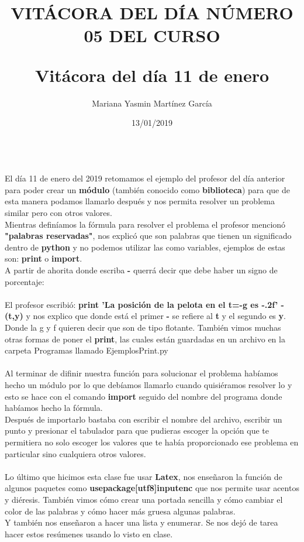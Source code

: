 \documentclass[letterpaper, 12pt, twoside]{article}
\title{\Huge\item\color{red}\textbf {VITÁCORA DEL DÍA NÚMERO 05 DEL CURSO}}
\author{Mariana Yasmin Martínez García}
\date{13/01/2019}
\begin{document}
	\maketitle
	
	\newpage
	\title{\huge\textbf{Vitácora del día 11 de enero\\}} \\
	El día 11 de enero del 2019 retomamos el ejemplo del profesor del día anterior para poder crear un \textbf{módulo} (también conocido como \textbf{biblioteca}) para que de esta manera podamos llamarlo después y nos permita resolver un problema similar pero con otros valores.\\
	Mientras definíamos la fórmula para resolver el problema el profesor  mencionó \textbf{"palabras reservadas"}, nos explicó que son palabras que tienen un significado dentro de \textbf{python} y no podemos utilizar las como variables, ejemplos de estas son: \textbf{print} o \textbf{import}. \\
	A partir de ahorita donde escriba \textbf{-} querrá decir que debe haber un signo de porcentaje:\\ \\
	El profesor escribió: \textbf{print 'La posición de la pelota en el t=-g es -.2f' - (t,y)}
	y nos explico que donde está el primer \textbf{-} se refiere al \textbf{t} y el segundo es \textbf{y}. Donde la g y f quieren decir que son de tipo flotante.
	También vimos muchas otras formas de poner el \textbf{print}, las cuales están guardadas en un archivo en la carpeta Programas llamado EjemplosPrint.py \\  \\
	Al terminar de difinir nuestra función para solucionar el problema habíamos hecho un módulo por lo que debíamos llamarlo cuando quisiéramos resolver lo y esto se hace con el comando \textbf{import} seguido del nombre del programa donde habíamos hecho la fórmula. \\
	Después de importarlo bastaba con escribir el nombre del archivo, escribir un punto y presionar el tabulador para que pudieras escoger la opción que te permitiera no solo escoger los valores que te había proporcionado ese problema en particular sino cualquiera otros valores.\\ \\
	Lo último que hicimos esta clase fue usar \textbf{Latex}, nos enseñaron la función de algunos paquetes como \textbf{usepackage[utf8]{inputenc}} que nos permite usar acentos y diéresis. También vimos cómo crear una portada sencilla y cómo cambiar el color de las palabras y cómo hacer más gruesa algunas palabras. \\
	Y también nos enseñaron a hacer una lista  y enumerar.
	Se nos dejó de tarea hacer estos resúmenes usando lo visto en clase.
	
	
\end{document}
